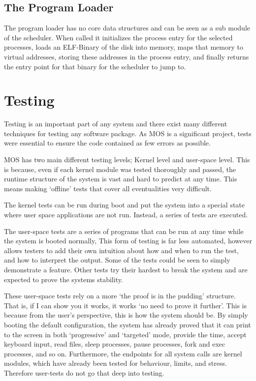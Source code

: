 \documentclass[a4paper]{report}
\begin{document}
\section{The Program Loader}

The program loader has no core data structures and can be seen as a sub module of the scheduler. When called it initializes the process entry for the selected processes, loads an ELF-Binary of the disk into memory, maps that memory to virtual addresses, storing these addresses in the process entry, and finally returns the entry point for that binary for the scheduler to jump to.








\chapter{Testing}

Testing is an important part of any system and there exist many different techniques for testing any software package. As MOS is a significant project, tests were essential to ensure the code contained as few errors as possible.

MOS has two main different testing levels; Kernel level and user-space level. This is because, even if each kernel module was tested thoroughly and passed, the runtime structure of the system is vast and hard to predict at any time. This means making `offline' tests that cover all eventualities very difficult.

The kernel tests can be run during boot and put the system into a special state where user space applications are not run. Instead, a series of tests are executed.

The user-space tests are a series of programs that can be run at any time while the system is booted normally, This form of testing is far less automated, however allows testers to add their own intuition about how and when to run the test, and how to interpret the output. Some of the tests could be seen to simply demonstrate a feature. Other tests try their hardest to break the system and are expected to prove the systems stability.

These user-space tests rely on a more `the proof is in the pudding' structure. That is, if I can show you it works, it works `no need to prove it further'. This is because from the user's perspective, this is how the system should be. By simply booting the default configuration, the system has already proved that it can print to the screen in both `progressive' and `targeted' mode, provide the time, accept keyboard input, read files, sleep processes, pause processes, fork and exec processes, and so on. Furthermore, the endpoints for all system calls are kernel modules, which have already been tested for behaviour, limits, and stress. Therefore user-tests do not go that deep into testing.
\end{document}
